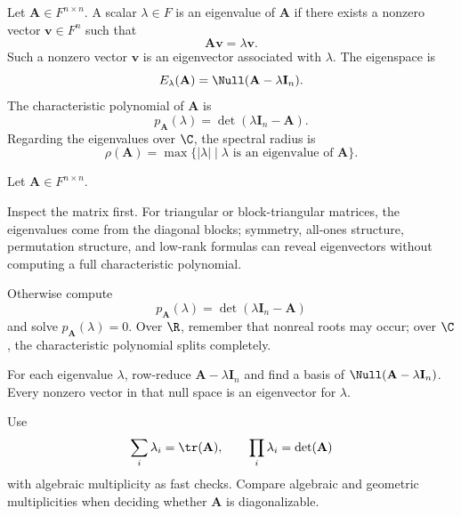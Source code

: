     \begin{definition}
        Let $\mathbf{A}\in F^{n\times n}$. A scalar $\lambda\in F$ is an
        eigenvalue of $\mathbf{A}$ if there exists a nonzero vector
        $\mathbf{v}\in F^n$ such that
        \[
            \mathbf{A}\mathbf{v}=\lambda\mathbf{v}.
        \]
        Such a nonzero vector $\mathbf{v}$ is an eigenvector associated with
        $\lambda$. The eigenspace is
        \[
            E_\lambda(\mathbf{A})
            =
            \Null(\mathbf{A}-\lambda\mathbf{I}_n).
        \]
        The characteristic polynomial of $\mathbf{A}$ is
        \[
            p_{\mathbf{A}}(\lambda)
            =
            \det(\lambda\mathbf{I}_n-\mathbf{A}).
        \]
        Regarding the eigenvalues over $\C$, the spectral radius is
        \[
            \rho(\mathbf{A})
            =
            \max\{\lvert\lambda\rvert\mid\lambda\text{ is an eigenvalue of }\mathbf{A}\}.
        \]
    \end{definition}


    \begin{algorithm}
        Let $\mathbf{A}\in F^{n\times n}$.
        \begin{bookitems}
            \item Inspect the matrix first. For triangular or block-triangular
                  matrices, the eigenvalues come from the diagonal blocks;
                  symmetry, all-ones structure, permutation structure, and
                  low-rank formulas can reveal eigenvectors without computing a
                  full characteristic polynomial.
            \item Otherwise compute
                  \[
                      p_{\mathbf{A}}(\lambda)
                      =\det(\lambda\mathbf{I}_n-\mathbf{A})
                  \]
                  and solve $p_{\mathbf{A}}(\lambda)=0$. Over $\R$, remember
                  that nonreal roots may occur; over $\C$, the characteristic
                  polynomial splits completely.
            \item For each eigenvalue $\lambda$, row-reduce
                  $\mathbf{A}-\lambda\mathbf{I}_n$ and find a basis of
                  $\Null(\mathbf{A}-\lambda\mathbf{I}_n)$. Every nonzero vector
                  in that null space is an eigenvector for $\lambda$.
            \item Use
                  \[
                      \sum_i\lambda_i=\tr(\mathbf{A}),
                      \qquad
                      \prod_i\lambda_i=\det(\mathbf{A})
                  \]
                  with algebraic multiplicity as fast checks. Compare algebraic
                  and geometric multiplicities when deciding whether
                  $\mathbf{A}$ is diagonalizable.
        \end{bookitems}
    \end{algorithm}

